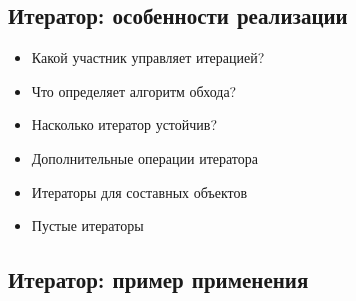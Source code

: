 \subsection{Итератор: особенности реализации}
\begin{itemize}
    \item Какой участник управляет итерацией?
    \item Что определяет алгоритм обхода?
    \item Насколько итератор устойчив?
    \item Дополнительные операции итератора
    \item Итераторы для составных объектов
    \item Пустые итераторы
\end{itemize}
\subsection{Итератор: пример применения}
